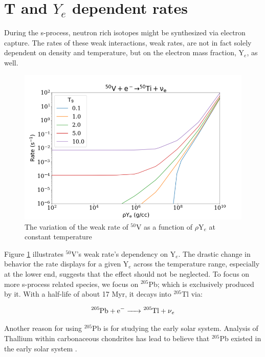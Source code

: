 \documentclass{article}
\begin{document}
\section*{T and $Y_{e}$ dependent rates}

During the s-process, neutron rich isotopes might be synthesized via electron capture. The rates of these weak interactions, weak rates, 
are not in fact solely dependent on density and temperature, but on the electron mass fraction, Y$_{e}$, as well.

\begin{figure}[H]
    \centerline{\includegraphics[scale = 0.5]{images/van_weak.png}}
    \caption{The variation of the weak rate of $^{50}$V as a function of $\rho$Y$_{e}$ at constant temperature}
    \label{weak}
\end{figure}

Figure \ref{weak} illustrates $^{50}$V's weak rate's dependency on Y$_{e}$. The drastic change in behavior the rate displays for a 
given Y$_{e}$ across the temperature range, especially at the lower end, suggests that the effect should not be neglected. To focus 
on more s-process related species, we focus on $^{205}$Pb; which is exclusively produced by it. With a half-life of about 17 Myr, 
it decays into $^{205}$Tl via:

\begin{align*}
    \ce{^205Pb + e^- -> ^205Tl + \nu_{e}}
\end{align*}

Another reason for using $^{205}$Pb is for studying the early solar system. Analysis of Thallium within carbonaceous chondrites
has lead to believe that $^{205}$Pb existed in the early solar system \cite{baker2010thallium}.
\end{document}
